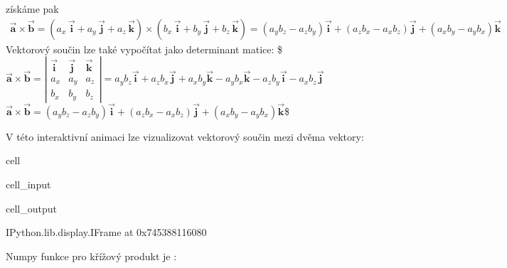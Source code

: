 \documentclass[letterpaper,10pt,english]{jupyterBook}
\begin{document}
\sphinxAtStartPar
získáme pak
\begin{equation*}
\begin{split} \overrightarrow{\mathbf{a}} \times \overrightarrow{\mathbf{b}} = (a_x\,\vec{\mathbf{i}} + a_y\,\vec{\mathbf{j}} + a_z\,\vec{\mathbf{k}}) \times (b_x\,\vec{\mathbf{i}}+b_y\,\vec{\mathbf{j}}+b_z\,\vec{\mathbf{k}}) = (a_y b_z-a_z b_y)\vec{\mathbf{i}} + (a_z b_x-a_x b_z)\vec{\mathbf{j}}+(a_x b_y- a_y b_x)\vec{\mathbf{k}} \end{split}
\end{equation*}
\sphinxAtStartPar
Vektorový součin lze také vypočítat jako determinant matice:
\$\( \overrightarrow{\mathbf{a}} \times \overrightarrow{\mathbf{b}} = \left| \begin{array}{ccc}
\vec{\mathbf{i}} & \vec{\mathbf{j}} & \vec{\mathbf{k}} \\
a_x & a_y & a_z \\
b_x & b_y & b_z 
\end{array} \right|
= a_y b_z \vec{\mathbf{i}} + a_z b_x \vec{\mathbf{j}} +  a_x b_y \vec{\mathbf{k}} - a_y b_x \vec{\mathbf{k}}-a_z b_y \vec{\mathbf{i}} - a_x b_z \vec{\mathbf{j}} \)\(
\)\(\overrightarrow{\mathbf{a}} \times \overrightarrow{\mathbf{b}} = (a_y b_z-a_z b_y)\vec{\mathbf{i}} + (a_z b_x-a_x b_z)\vec{\mathbf{j}} + (a_x b_y-a_y b_x)\vec{\mathbf{k}} \)\$

\sphinxAtStartPar
V této interaktivní animaci lze vizualizovat vektorový součin mezi dvěma vektory:

\begin{sphinxuseclass}{cell}\begin{sphinxVerbatimInput}

\begin{sphinxuseclass}{cell_input}
\begin{sphinxVerbatim}[commandchars=\\\{\}]
        
\end{sphinxVerbatim}

\end{sphinxuseclass}\end{sphinxVerbatimInput}
\begin{sphinxVerbatimOutput}

\begin{sphinxuseclass}{cell_output}
\begin{sphinxVerbatim}[commandchars=\\\{\}]
\PYGZlt{}IPython.lib.display.IFrame at 0x745388116080\PYGZgt{}
\end{sphinxVerbatim}

\end{sphinxuseclass}\end{sphinxVerbatimOutput}

\end{sphinxuseclass}
\sphinxAtStartPar
Numpy funkce pro křížový produkt je :
\end{document}
